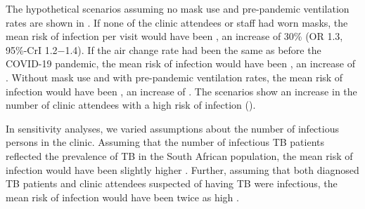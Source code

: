 \documentclass[fleqn,11pt]{wlscirep}
\begin{document}
The hypothetical scenarios assuming no mask use and pre-pandemic ventilation rates are shown in  . If none of the clinic attendees or staff had worn masks, the mean risk of infection per visit would have been , an increase of 30\% (OR 1.3, 95\%-CrI 1.2$-$1.4). If the air change rate had been the same as before the COVID-19 pandemic, the mean risk of infection would have been , an increase of . Without mask use and with pre-pandemic ventilation rates, the mean risk of infection would have been , an increase of . The scenarios show an increase in the number of clinic attendees with a high risk of infection (). 

In sensitivity analyses, we varied assumptions about the number of infectious persons in the clinic. Assuming that the number of infectious TB patients reflected the prevalence of TB in the South African population, the mean risk of infection would have been slightly higher . Further, assuming that both diagnosed TB patients and clinic attendees suspected of having TB were infectious, the mean risk of infection would have been twice as high .  
\end{document}
